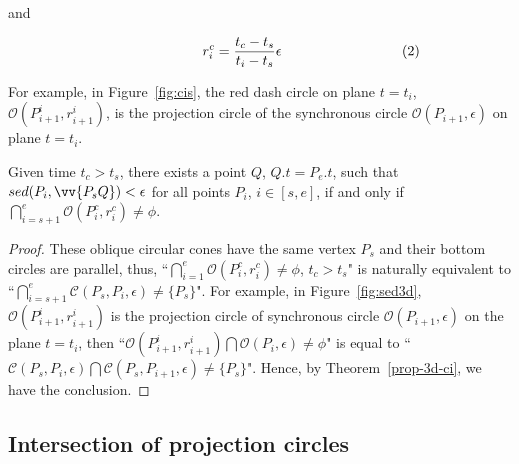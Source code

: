 and

\vspace{-2ex}
\begin{equation*}
\label{equ-proj-circle-r}
    \begin{aligned}
        \hspace{17ex}  r^c_i =\frac{t_c-t_s}{t_i-t_s}{\epsilon}   \hspace{20ex}(2) \\
    \end{aligned}
\end{equation*}
\vspace{-1ex}



For example, in Figure~\ref{fig:cis}, the red dash circle on plane $t=t_i$, \ie $\mathcal{O}(P^i_{i+1}, r^i_{i+1})$, is the projection circle of the synchronous circle $\mathcal{O}(P_{i+1}, \epsilon)$ on plane $t=t_i$.

\vspace{1ex}

\begin{cor}
\label{prop-circle-intersection}
Given time $t_c > t_s$, there exists a point $Q$, $Q.t = P_e.t$, such that $sed(P_i, \vv{P_sQ})<\epsilon$ for all points $P_i$, $i \in [s,e]$, if and only if $\bigcap_{i=s+1}^{e}{\mathcal{O}(P^c_i, r^c_i)} \ne \phi$.
\end{cor}


\begin{proof}
These oblique circular cones have the same vertex $P_s$ and their bottom circles are parallel, thus,
 ``$\bigcap_{i=1}^{e}{\mathcal{O}(P^c_i, r^c_i)} \ne \phi$, $t_c > t_s$" is naturally equivalent to ``$\bigcap_{i=s+1}^{e}{\mathcal{C}(P_s, P_i, \epsilon)} \ne \{P_s\}$".
For example, in Figure~\ref{fig:sed3d}, $\mathcal{O}(P^i_{i+1}, r^i_{i+1})$ is the projection circle of synchronous circle $\mathcal{O}(P_{i+1}, \epsilon)$ on the plane $t=t_i$, then ``${\mathcal{O}(P^i_{i+1}, r^i_{i+1})} \bigcap{\mathcal{O}(P_i, \epsilon)} \ne \phi$" is equal to ``$\mathcal{C}(P_s, P_i, \epsilon) \bigcap {\mathcal{C}(P_s, P_{i+1}, \epsilon)} \ne \{P_s\}$".
Hence, by Theorem~\ref{prop-3d-ci}, we have the conclusion.
\end{proof}


\subsection{Intersection of projection circles }

